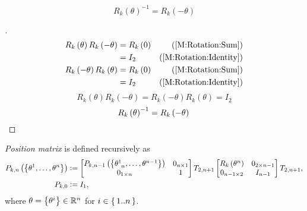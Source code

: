 \documentclass[stu, babel, american, biblatex, a4paper, leqno, draftall]{apa7}
\begin{document}
\begin{corollary}\label{M:Rotation:Inverse}
\begin{equation*}
	R_k\left(\theta\right)^{-1} = R_k\left(-\theta\right)
\end{equation*}
\end{corollary}
\begin{proof}[]
    \begin{align*}
        R_k\left(\theta\right)R_k\left(-\theta\right)
        &= R_k\left(0\right) & \text{(\cref{M:Rotation:Sum})} \\
        &= I_2 & \text{(\cref{M:Rotation:Identity})} \\
        R_k\left(-\theta\right)R_k\left(\theta\right)
        &= R_k\left(0\right) & \text{(\cref{M:Rotation:Sum})} \\
        &= I_2 & \text{(\cref{M:Rotation:Identity})}
    \end{align*}
    \begin{equation*}
        R_k\left(\theta\right)R_k\left(-\theta\right)
        = R_k\left(-\theta\right)R_k\left(\theta\right)
        = I_2
    \end{equation*}
    \begin{equation*}
        {R_k\left(\theta\right)}^{-1}
        =
        R_k\left(-\theta\right)
        \qedhere
    \end{equation*}
\end{proof}
\begin{definition}\label{M:Position}
    \textit{Position matrix} is defined recursively as
    \begin{align*}
        P_{k,n}\left(\left\{\tensor{\theta}{^1},\dots,\tensor{\theta}{^n}\right\}\right) & \defeq
        \begin{bmatrix}
            P_{k,n-1}\left(\left\{\tensor{\theta}{^1_{n}},\dots,\tensor{\theta}{^{n-1}}\right\}\right) & 0_{n\times 1} \\
            0_{1\times n}                                                                                      & 1 \\
        \end{bmatrix}
        T_{2,n+1}
        \begin{bmatrix}
            R_k\left(\tensor{\theta}{^n}\right) & 0_{{2}\times{n-1}} \\
            0_{{n-1}\times{2}}                                   & {I}_{n-1} \\
        \end{bmatrix}
        T_{2,n+1} \text{,}                                                                                        \\
        P_{k,0}                                                                          & \defeq I_1\text{,}
    \end{align*}
    where $\theta=\left\{\tensor{\theta}{^i}\right\}\in\R^n$ for $i\in\set{1..n}$.
\end{definition}
\end{document}
